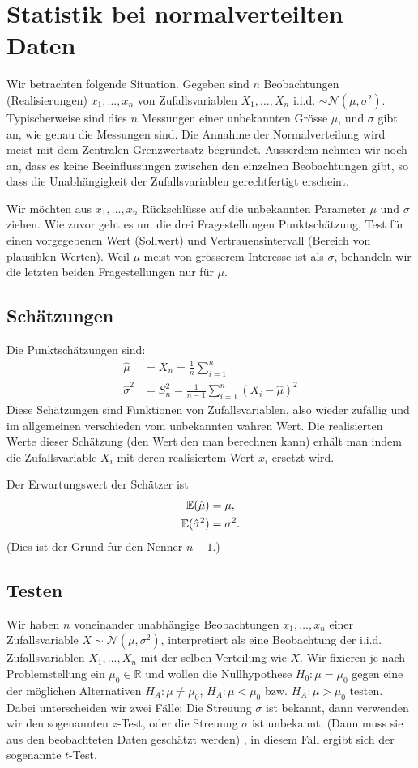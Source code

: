 \chapter{Statistik bei normalverteilten Daten}
Wir betrachten folgende Situation. Gegeben sind $n$ Beobachtungen (Realisierungen) $x_1,\ldots,x_n$ von Zufallsvariablen $X_1,\ldots,X_n$ i.i.d. $\sim \mathcal{N}(\mu,\sigma^2)$. Typischerweise sind dies $n$ Messungen einer unbekannten Grösse $\mu$, und $\sigma$ gibt an, wie genau die Messungen sind. Die Annahme der Normalverteilung wird meist mit dem Zentralen Grenzwertsatz begründet. Ausserdem nehmen wir noch an, dass es keine Beeinflussungen zwischen den einzelnen Beobachtungen gibt, so dass die Unabhängigkeit der Zufallsvariablen gerechtfertigt erscheint.

Wir möchten aus $x_1,\ldots,x_n$ Rückschlüsse auf die unbekannten Parameter $\mu$ und $\sigma$ ziehen. Wie zuvor geht es um die drei Fragestellungen Punktschätzung, Test für einen vorgegebenen Wert (Sollwert) und Vertrauensintervall (Bereich von plausiblen Werten). Weil $\mu$ meist von grösserem Interesse ist als $\sigma$, behandeln wir die letzten beiden Fragestellungen nur für $\mu$.
\section{Schätzungen}
Die Punktschätzungen sind:
\begin{align}
	\hat{\mu}&=\overline{X}_n=\frac{1}{n}\sum_{i=1}^{n}\\
	\hat{\sigma}^2&=S_{n}^{2}=\frac{1}{n-1}\sum_{i=1}^{n}\left( X_i-\hat{\mu} \right)^2
	\label{eq:schaetzer}
\end{align}
Diese Schätzungen sind Funktionen von Zufallsvariablen, also wieder zufällig und im allgemeinen verschieden vom unbekannten wahren Wert. Die realisierten Werte dieser Schätzung (den Wert den man berechnen kann) erhält man indem die Zufallsvariable $X_i$ mit deren realisiertem Wert $x_i$ ersetzt wird.

Der Erwartungswert der Schätzer ist
\begin{align*}
	\operatorname{\mathbb E}(\hat{\mu})&=\mu,\\
	\operatorname{\mathbb E}(\hat{\sigma}^2)&=\sigma^2.
\end{align*}
(Dies ist der Grund für den Nenner $n-1$.)
\section{Testen}
\label{sec9.2}
Wir haben $n$ voneinander unabhängige Beobachtungen $x_1,\ldots,x_n$ einer Zufallsvariable $X\sim \mathcal{N}(\mu,\sigma^2)$, interpretiert als eine Beobachtung der i.i.d. Zufallsvariablen $X_1,\ldots,X_n$ mit der selben Verteilung wie $X$. Wir fixieren je nach Problemstellung ein $\mu_0\in\mathbb{R}$ und wollen die Nullhypothese $H_0:\mu=\mu_0$ gegen eine der möglichen Alternativen $H_A:\mu\neq \mu_0$, $H_A:\mu<\mu_0$ bzw. $H_A:\mu>\mu_0$ testen. Dabei unterscheiden wir zwei Fälle: Die Streuung $\sigma$ ist bekannt, dann verwenden wir den sogenannten $z$-Test, oder die Streuung $\sigma$ ist unbekannt. (Dann muss sie aus den beobachteten Daten geschätzt werden) , in diesem Fall ergibt sich der sogenannte $t$-Test.
